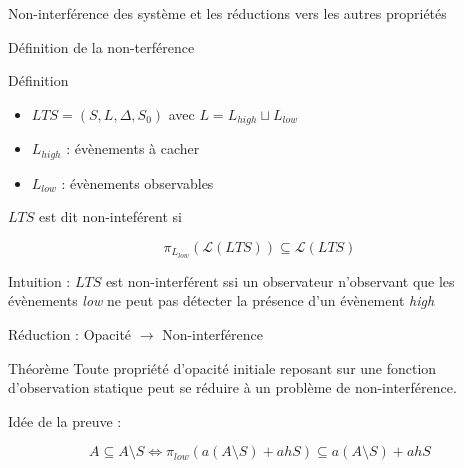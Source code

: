 \documentclass[11pt]{beamer}
\begin{document}
\begin{section}{Non-interf\'erence des syst\`eme et les r\'eductions vers les autres propri\'et\'es}


\begin{frame}{D\'efinition de la non-terf\'erence}
\begin{block}{D\'efinition}
\begin{itemize}
  \item $LTS = (S,L,\Delta,S_0)$ avec $L=L_{high}\sqcup L_{low}$
  \item $L_{high}$ : \'ev\`enements \`a cacher
  \item $L_{low}$ : \'ev\`enements observables
\end{itemize}

$LTS$ est dit non-intef\'erent si

$$\pi_{L_{low}}(\mathcal L(LTS)) \subseteq \mathcal L(LTS)$$

Intuition : $LTS$ est non-interf\'erent ssi un observateur n'observant que les \'ev\`enements \emph{low} ne peut pas d\'etecter la pr\'esence d'un \'ev\`enement \emph{high}
\end{block}
\end{frame}
 
\begin{frame}{R\'eduction : Opacit\'e $\to$ Non-interf\'erence}
\begin{beamerlikethm}{Th\'eor\`eme {\cite[page 5]{BryansKMR08}}}
Toute propri\'et\'e d'opacit\'e initiale reposant sur une fonction d'observation statique peut se r\'eduire \`a un probl\`eme  de non-interf\'erence.
\end{beamerlikethm}

Id\'ee de la preuve :

\begin{figure}[H]
  \centering
\end{figure}

$$A \subseteq A\setminus S \iff \pi_{low}(a(A\setminus S) + a h S)\subseteq a(A\setminus S) + a h S$$
\end{frame}


\end{section}
\end{document}

